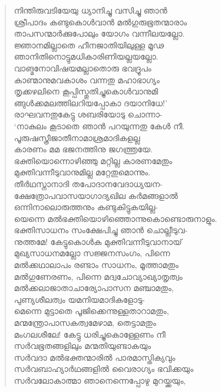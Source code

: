 \begin{verse}
നിന്തിരുവടിയേയു ധ്യാനിച്ചു വസിച്ചു ഞാന്‍\\
ശ്രീപാദം കണ്ടുകൊള്‍വാന്‍ മല്‍ഗുരുഭൂതന്മാരാം\\
താപസന്മാര്‍ക്കുപോലും യോഗം വന്നീലയല്ലോ.\\
ജ്ഞാനമില്ലാതെ ഹീനജാതിയിലുള്ള മൂഢ\\
ഞാനിതിനൊട്ടുമധികാരിണിയല്ലയല്ലോ.\\
വാങ്മനോവിഷയമല്ലാതൊരു ഭവദ്രൂപം\\
കാണ്മാനുമവകാശം വന്നതു മഹാഭാഗ്യം\\
തൃക്കഴലിനെ കൂപ്പിസ്തുതിച്ചുകൊള്‍വാനുമി\\
ങ്ങുള്‍ക്കമലത്തിലറിയപ്പോകാ ദയാനിധേ!’\\
രാഘവനതുകേട്ടു ശബരിയോടു ചൊന്നാ-\\
‘നാകുലം കൂടാതെ ഞാന്‍ പറയുന്നതു കേള്‍ നീ.\\
പൂരുഷസ്ത്രീജാതീനാമാശ്രമാദികളല്ല\\
കാരണം മമ ഭജനത്തിനു ജഗത്ത്രയേ.\\
ഭക്തിയൊന്നൊഴിഞ്ഞു മറ്റില്ല കാരണമേതും\\
മുക്തിവന്നീടുവാനുമില്ല മറ്റേതുമൊന്നും.\\
തീര്‍ഥസ്നാനാദി തപോദാനവേദാധ്യയന-\\
ക്ഷേത്രോപവാസയാഗാദ്യഖില കര്‍മങ്ങളാല്‍\\
ഒന്നിനാലൊരുത്തനും കണ്ടുകിട്ടുകയില്ല-\\
യെന്നെ മല്‍ഭക്തിയൊഴിഞ്ഞൊന്നുകൊണ്ടൊരുനാളും.\\
ഭക്തിസാധനം സംക്ഷേപിച്ചു ഞാന്‍ ചൊല്ലീടുവ-\\
നുത്തമേ! കേട്ടുകൊള്‍ക മുക്തിവന്നീടുവാനായ്\\
മുഖ്യസാധനമല്ലോ സജ്ജനസംഗം, പിന്നെ\\
മല്‍ക്കഥാലാപം രണ്ടാം സാധനം, മൂത്താമതും\\
മല്‍ഗുണേരണം, പിന്നെ മദ്വചോവ്യാഖ്യാതൃത്വം\\
മല്‍ക്കലാജാതാചാര്യോപാസന മഞ്ചാമതും,\\
പുണ്യശീലത്വം യമനിയമാദികളോടു-\\
മെന്നെ മുട്ടാതെ പൂജിക്കെന്നുള്ളതാറാമതും,\\
മന്മന്ത്രോപാസകത്വമേഴാമ, തെട്ടാമതും\\
മംഗലശീലേ! കേട്ടു ധരിച്ചുകൊള്ളേണം നീ\\
സര്‍വഭൂതങ്ങളിലും മന്മതിയുണ്ടാകയും\\
സര്‍വദാ മല്‍ഭക്തന്മാരില്‍ പാരമാസ്തിക്യവും\\
സര്‍വബാഹ്യാര്‍ഥങ്ങളില്‍ വൈരാഗ്യം ഭവിക്കയും\\
സര്‍വലോകാത്മാ ഞാനെന്നെപ്പോഴു മുറയ്ക്കയും,\\

\end{verse}
